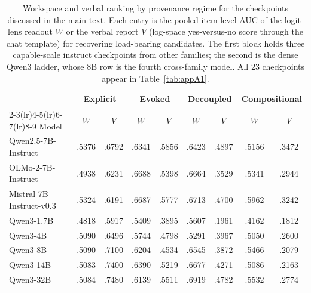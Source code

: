 \begin{table}[tbp]
\centering
\caption{Workspace and verbal ranking by provenance regime for the checkpoints discussed in the main text. Each entry is the pooled item-level AUC of the logit-lens readout $W$ or the verbal report $V$ (log-space yes-versus-no score through the chat template) for recovering load-bearing candidates. The first block holds three capable-scale instruct checkpoints from other families; the second is the dense Qwen3 ladder, whose 8B row is the fourth cross-family model. All 23 checkpoints appear in Table~\ref{tab:appA1}.}
\label{tab:master}
\footnotesize
\setlength{\tabcolsep}{3.8pt}
\begin{tabular}{l*{8}{c}}
\toprule
 & \multicolumn{2}{c}{Explicit} & \multicolumn{2}{c}{Evoked} & \multicolumn{2}{c}{Decoupled} & \multicolumn{2}{c}{Compositional} \\
\cmidrule(lr){2-3}\cmidrule(lr){4-5}\cmidrule(lr){6-7}\cmidrule(lr){8-9}
Model & $W$ & $V$ & $W$ & $V$ & $W$ & $V$ & $W$ & $V$ \\
\midrule
Qwen2.5-7B-Instruct & .5376 & .6792 & .6341 & .5856 & .6423 & .4897 & .5156 & .3472 \\
OLMo-2-7B-Instruct & .4938 & .6231 & .6688 & .5398 & .6664 & .3529 & .5341 & .2944 \\
Mistral-7B-Instruct-v0.3 & .5324 & .6191 & .6687 & .5777 & .6713 & .4700 & .5962 & .3242 \\
\midrule
Qwen3-1.7B & .4818 & .5917 & .5409 & .3895 & .5607 & .1961 & .4162 & .1812 \\
Qwen3-4B & .5090 & .6496 & .5744 & .4798 & .5291 & .3967 & .5050 & .2600 \\
Qwen3-8B & .5090 & .7100 & .6204 & .4534 & .6545 & .3872 & .5466 & .2079 \\
Qwen3-14B & .5083 & .7400 & .6390 & .5219 & .6677 & .4271 & .5086 & .2163 \\
Qwen3-32B & .5084 & .7480 & .6139 & .5511 & .6919 & .4782 & .5532 & .2774 \\
\bottomrule
\end{tabular}
\end{table}
